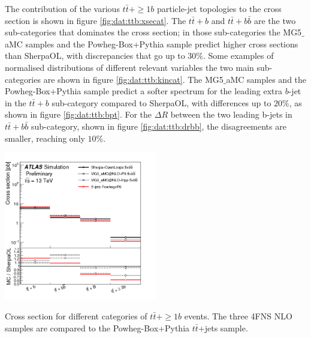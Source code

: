 \par The contribution of the various $t\bar{t}+\ge1b$ particle-jet topologies to the cross section is shown in figure \ref{fig:dat:ttb:xsecat}. The $t\bar{t}+b$ and $t\bar{t}+b\bar{b}$ are the two sub-categories that dominates the cross section; in those sub-categories the {\sc MG5$\_$aMC} samples and the {\sc Powheg-Box+Pythia} sample predict higher cross sections than {\sc SherpaOL}, with discrepancies that go up to $30\%$.  Some examples of normalised distributions of different relevant variables the two main sub-categories are shown in figure \ref{fig:dat:ttb:kincat}. The {\sc MG5$\_$aMC} samples and the {\sc Powheg-Box+Pythia} sample predict a softer spectrum for the leading extra $b$-jet in the $t\bar{t}+b$ sub-category compared to {\sc SherpaOL}, with differences up to $20\%$, as shown in figure \ref{fig:dat:ttb:bpt}. For the $\Delta R$ between the two leading b-jets in $t\bar{t}+b\bar{b}$ sub-category, shown in figure \ref{fig:dat:ttb:drbb}, the disagreements are smaller, reaching only $10\%$. 

\bfig[b!]
\centering
\includegraphics[width=0.5\textwidth]{figures/Datasamples/ttbbxsec2.png}
\captionsetup{width=0.85\textwidth} \caption{\small Cross section for different categories of $t\bar{t}+\ge1b$ events. The three 4FNS NLO samples are compared to the {\sc Powheg-Box+Pythia} $t\bar{t}$+jets sample.}
\label{fig:dat:ttb:xsecat}
\efig



